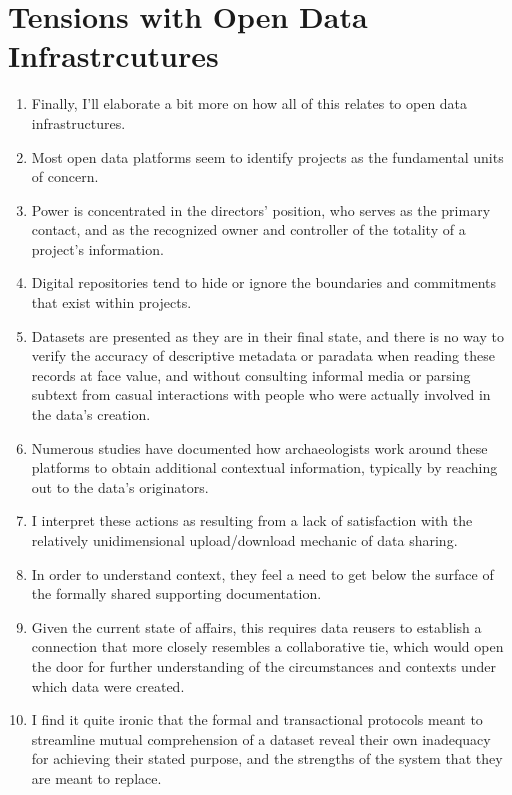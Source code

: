 \documentclass[12pt]{article}
\begin{document}
\section{Tensions with Open Data Infrastrcutures}
\begin{enumerate}
  \item Finally, I'll elaborate a bit more on how all of this relates to open data infrastructures.
  \item Most open data platforms seem to identify projects as the fundamental units of concern.
  \item Power is concentrated in the directors' position, who serves as the primary contact, and as the recognized owner and controller of the totality of a project's information.
  \item Digital repositories tend to hide or ignore the boundaries and commitments that exist within projects.
  \item Datasets are presented as they are in their final state, and there is no way to verify the accuracy of descriptive metadata or paradata when reading these records at face value, and without consulting informal media or parsing subtext from casual interactions with people who were actually involved in the data's creation.
  \item Numerous studies have documented how archaeologists work around these platforms to obtain additional contextual information, typically by reaching out to the data's originators.
  \item I interpret these actions as resulting from a lack of satisfaction with the relatively unidimensional upload/download mechanic of data sharing.
  \item In order to understand context, they feel a need to get below the surface of the formally shared supporting documentation.
  \item Given the current state of affairs, this requires data reusers to establish a connection that more closely resembles a collaborative tie, which would open the door for further understanding of the circumstances and contexts under which data were created.
  \item I find it quite ironic that the formal and transactional protocols meant to streamline mutual comprehension of a dataset reveal their own inadequacy for achieving their stated purpose, and the strengths of the system that they are meant to replace.
\end{enumerate}
\end{document}
